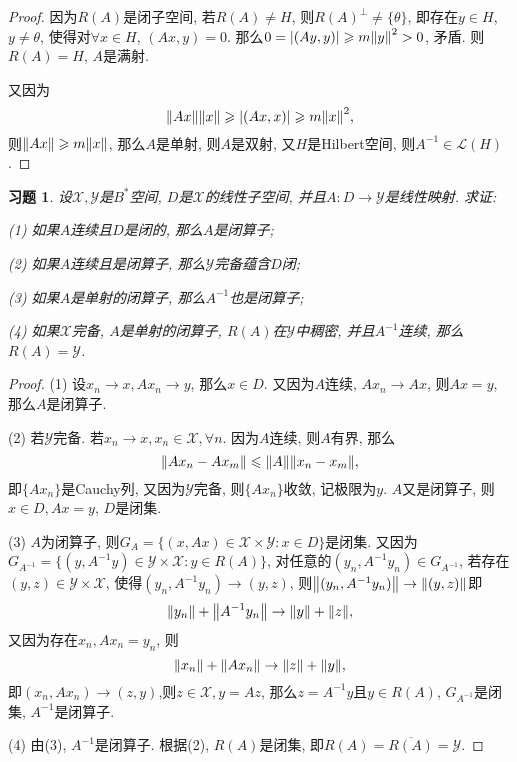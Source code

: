 \documentclass[a4paper,oneside,12pt]{ctexart}
\theoremstyle{plain}
\newtheorem{exercise}{习题}
\theoremstyle{nonumberplain}
\theoremstyle{nonumberplain}
\newtheorem{proof}{证明}
\newcommand{\sX}{\mathscr{X}}
\newcommand{\sY}{\mathscr{Y}}
\newcommand{\sL}{\mathscr{L}}
\begin{document}
    \begin{proof}
        因为$R(A)$是闭子空间, 若$R(A)\neq H$, 则$R(A)^\perp\neq\{\theta\}$, 即存在$y\in H$, $y\neq \theta$, 使得对$\forall x\in H$, $(Ax,y)=0$.
        那么$0=\abs{(Ay,y)}\geqslant m\norm{y}^2>0$, 矛盾. 则$R(A)=H$, $A$是满射.

        又因为 
        \begin{equation*}
            \norm{Ax}\norm{x}\geqslant \abs{(Ax,x)}\geqslant m\norm{x}^2,
        \end{equation*}
        则$\norm{Ax}\geqslant m\norm{x}$, 那么$A$是单射, 则$A$是双射, 又$H$是Hilbert空间, 则$A^{-1}\in\sL(H)$.
    \end{proof}

    \begin{exercise}
        \label{ex:2.3.4}
        设$\sX, \sY$是$B^\ast$空间, $D$是$\sX$的线性子空间, 并且$A:D\to\sY$是线性映射. 求证: 
        
        (1) 如果$A$连续且$D$是闭的, 那么$A$是闭算子;

        (2) 如果$A$连续且是闭算子, 那么$\sY$完备蕴含$D$闭;

        (3) 如果$A$是单射的闭算子, 那么$A^{-1}$也是闭算子;

        (4) 如果$\sX$完备, $A$是单射的闭算子, $R(A)$在$\sY$中稠密, 并且$A^{-1}$连续, 那么$R(A)=\sY$.
    \end{exercise}

    \begin{proof}
        (1) 设$x_n\to x,Ax_n\to y$, 那么$x\in D$. 又因为$A$连续, $Ax_n\to Ax$, 则$Ax=y$, 那么$A$是闭算子.

        (2) 若$\sY$完备. 若$x_n\to x,x_n\in \sX,\forall n$. 因为$A$连续, 则$A$有界, 那么\begin{equation*}
            \norm{Ax_n-Ax_m}\leqslant \norm{A}\norm{x_n-x_m},
        \end{equation*} 
        即$\{Ax_n\}$是Cauchy列, 又因为$\sY$完备, 则$\{Ax_n\}$收敛, 记极限为$y$. $A$又是闭算子, 则$x\in D,Ax=y$, $D$是闭集.

        (3) $A$为闭算子, 则$G_A=\{(x,Ax)\in\sX\times \sY:x\in D\}$是闭集. 又因为$G_{A^{-1}}=\{(y,A^{-1}y)\in\sY\times\sX:y\in R(A)\}$, 
        对任意的$(y_n,A^{-1}y_n)\in G_{A^{-1}}$, 若存在$(y,z)\in\sY\times\sX$, 使得$(y_n,A^{-1}y_n)\to (y,z)$, 则$\norm{(y_n,A^{-1}y_n)}\to\norm{(y,z)}$即 
        \begin{equation*}
            \norm{y_n}+\norm{A^{-1}y_n}\to\norm{y}+\norm{z},
        \end{equation*}
        又因为存在$x_n,Ax_n=y_n$, 则 
        \begin{equation*}
            \norm{x_n}+\norm{Ax_n}\to\norm{z}+\norm{y},
        \end{equation*}
        即$(x_n,Ax_n)\to(z,y)$,则$z\in \sX, y=Az$, 那么$z=A^{-1}y$且$y\in R(A)$, $G_{A^{-1}}$是闭集, $A^{-1}$是闭算子.

        (4) 由(3), $A^{-1}$是闭算子. 根据(2), $R(A)$是闭集, 即$R(A)=\overline{R(A)}=\sY$.
    \end{proof}
\end{document}
